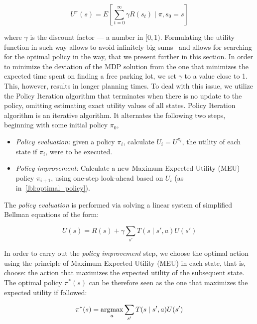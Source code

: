 \begin{equation}
\label{eq:discount_utility}
U^{\pi}(s) = E\left[\sum_{t=0}^{\infty} \gamma R(s_t) \mid \pi,s_0 = s \right]
\end{equation}

where $\gamma$ is the discount factor --- a number in $[0, 1)$. Formulating
the utility function in such way allows to avoid infinitely big
sums~\cite{Russell:2003:AIM:773294} and allows for searching for the optimal
policy in the way, that we present further in this section. In order to
minimize the deviation of the MDP solution from the one that minimizes the
expected time spent on finding a free parking lot, we set $\gamma$ to a value
close to 1. This, however, results in longer planning times. To deal with this
issue, we utilize the Policy Iteration algorithm that terminates when there is
no update to the policy, omitting estimating exact utility values of all
states. Policy Iteration algorithm is an iterative algorithm. It alternates
the following two steps, beginning with some initial policy $\pi_0$,

\begin{itemize}
    \item \emph{Policy evaluation:} given a policy $\pi_i$,
    calculate $U_i = U^{\pi_i}$, the utility of each state if $\pi_i$, were to be
    executed.
    \item \emph{Policy improvement:} Calculate a new Maximum Expected Utility (MEU) policy $\pi_{i+1}$, using one-step look-ahead based on
    $U_i$ (as in~\eqref{lbl:optimal_policy}).
\end{itemize}

The \emph{policy evaluation} is performed via solving a linear system of simplified Bellman equations of the form:

\begin{equation}
\label{lbl:bellman_equation}
U(s) = R(s) + \gamma \sum_{s'}T(s \mid s', a)U(s')
\end{equation}

In order to carry out the \emph{policy improvement} step, we choose the
optimal action using the principle of Maximum Expected Utility (MEU) in each
state, that is, choose: the action that maximizes the expected utility of the
subsequent state. The optimal policy $\pi^*(s)$ can be therefore seen as the one that maximizes
the expected utility if followed:

\begin{equation}
\label{lbl:optimal_policy}
\pi^*(s) = \mathop{\rm argmax}_a \sum_{s'} T(s \mid s', a)U(s')
\end{equation}

